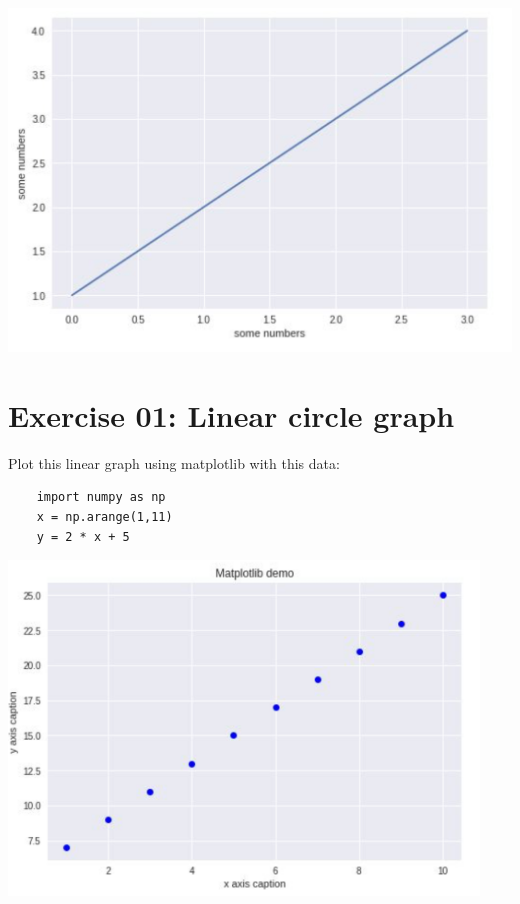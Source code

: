 \documentclass{42-en}
\begin{document}
\centerline{\includegraphics[width=150mm]{images/boring_line.png}}

\nextexercice
\newpage


\chapter{Exercise 01: Linear circle graph}
\makeheaderfiles

Plot this linear graph using matplotlib with this data:\\

\begin{lstlisting}
    import numpy as np
    x = np.arange(1,11)
    y = 2 * x + 5
\end{lstlisting}

\centerline{\includegraphics[width=125mm]{images/linear_pts.png}}
\end{document}
